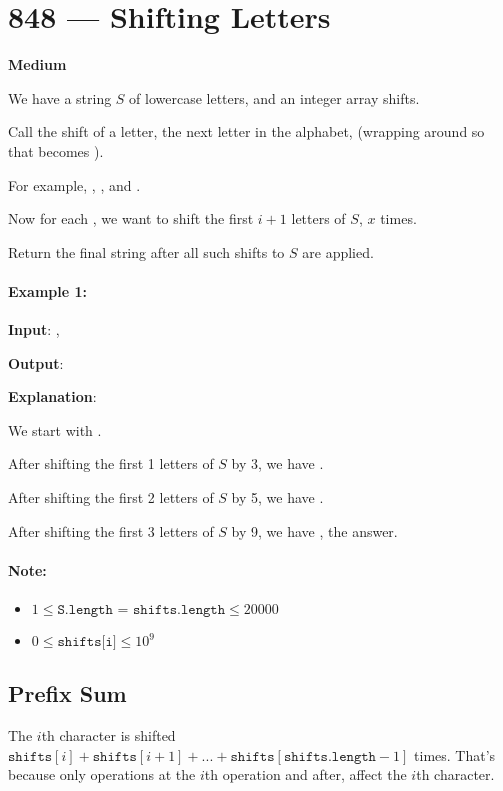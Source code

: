 \section{848 --- Shifting Letters}

\textbf{Medium}

We have a string $S$ of lowercase letters, and an integer array shifts.

Call the shift of a letter, the next letter in the alphabet, (wrapping around so that  becomes ). 

For example, , , and .

Now for each , we want to shift the first $i+1$ letters of $S$, $x$ times.

Return the final string after all such shifts to $S$ are applied.

\paragraph{Example 1:}

\begin{flushleft}
\textbf{Input}: , 

\textbf{Output}: 

\textbf{Explanation}: 

We start with .

After shifting the first 1 letters of $S$ by 3, we have .

After shifting the first 2 letters of $S$ by 5, we have .

After shifting the first 3 letters of $S$ by 9, we have , the answer.
\end{flushleft}

\paragraph{Note:}

\begin{itemize}
\item $1 \leq \texttt{S.length = shifts.length} \leq 20000$
\item $0 \leq \texttt{shifts[i]} \leq 10 ^ 9$
\end{itemize}

\subsection{Prefix Sum}
The $i$th character is shifted $\texttt{shifts}[i] + \texttt{shifts}[i+1] + ... + \texttt{shifts}[\texttt{shifts.length} - 1]$ times. That's because only operations at the $i$th operation and after, affect the $i$th character.

\setcounter{lstlisting}{0}
